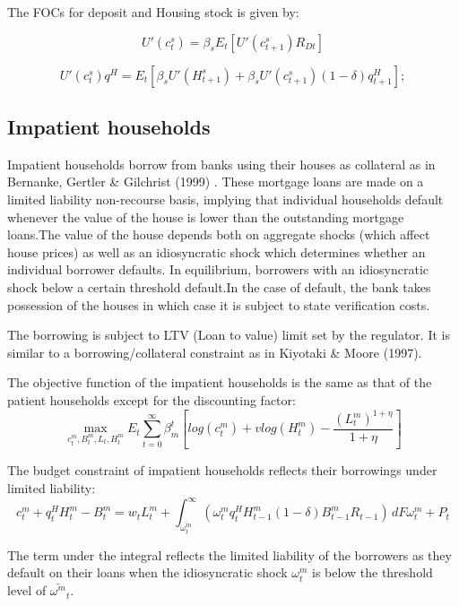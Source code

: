 \documentclass[12pt]{article}
\numberwithin{equation}{section}
\begin{document}
\begin{appendix}
The FOCs for deposit and Housing stock is given by:

\begin{equation}
U'(c^{s}_{t}) = \beta_sE_t[ U'(c^{s}_{t+1})R_{Dt}]
\end{equation}

\begin{equation}
U'(c^{s}_{t})q^H = E_t[\beta_sU'(H^{s}_{t+1}) + \beta_sU'(c^{s}_{t+1})(1-\delta)q^H_{t+1}];
\end{equation}

\subsection*{Impatient households}

Impatient households borrow from banks using their houses as collateral as in Bernanke, Gertler \& Gilchrist (1999) . These mortgage loans are made on a limited liability non-recourse basis,  implying that individual households default whenever the value of the house is lower than the outstanding mortgage loans.The value of the house depends both on aggregate shocks (which affect house prices) as well as an idiosyncratic shock which determines whether an individual borrower defaults. In equilibrium, borrowers with an idiosyncratic shock below a certain threshold default.In the case of default, the bank takes possession of the houses in which case it is subject to state verification costs.

The borrowing is subject to LTV (Loan to value) limit set by the regulator. It is similar to a borrowing/collateral constraint as in Kiyotaki \& Moore (1997).

The objective function of the impatient households is the same as that of the patient households except for the discounting factor:
\begin{equation}
\max_{c^m_t,B^m_t,L_{t},H^m_t}E_t\sum _{t=0}^{\infty } \beta^t_{m} [log(c^m_t)+vlog(H^m_t)-\frac{(L^m_t)^{1+\eta}}{1+\eta} ]
\end{equation}

The budget constraint of impatient households reflects their borrowings under limited liability:
\begin{equation}
c^m_t+q^H_{t}H^m_{t} -B^m_{t}=w_{t}L^m_{t}+\int_{\bar{\omega^m_{t} }}^\infty  \left(\omega^m_{t} q^H_{t} H^m_{t-1} (1-\delta)B^m_{t-1}R_{t-1}\right) \, dF\omega^m_{t} + P_{t}
\end{equation}

The term under the integral reflects the limited liability of the borrowers as they default on their loans when the idiosyncratic shock $\omega^m_{t}$ is below the threshold level of $\bar{\omega^m}_t$. 


\end{appendix}
\end{document}
